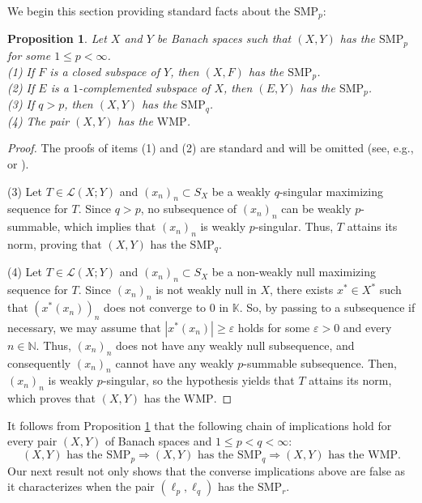 \documentclass[12 pt]{article}%
\newtheorem{proposition}[theorem]{Proposition}
\newtheorem{final remark}[theorem]{Final Remark}
\newcommand {\K} {\mathbb{K}}
\newcommand {\N} {\mathbb{N}}
\begin{document}
We begin this section providing standard facts about the $\mathrm{SMP}_p$:


\begin{proposition}
\label{prop1}
Let $X$ and $Y$ be Banach spaces such that $(X, Y)$ has the $\mathrm{SMP}_p$ for some $1 \leq p < \infty$. \\
{\rm (1)} If $F$ is a closed subspace of $Y$, then $(X,F)$ has the $\mathrm{SMP}_p$. \\
{\rm (2)} If $E$ is a $1$-complemented subspace of $X$, then $(E,Y)$ has the $\mathrm{SMP}_p$. \\
{\rm (3)} If $q > p$, then $(X, Y)$ has the $\mathrm{SMP}_q$. \\
{\rm (4)} The pair $(X, Y)$ has the $\mathrm{WMP}$.
\end{proposition}


\begin{proof}
    The proofs of items (1) and (2) are standard and will be omitted (see, e.g., \cite[Proposition 2.2]{dantasjung} or \cite[Proposition 3.3]{luizmiranda}). 

    (3) Let $T \in \mathcal{L}(X;Y)$ and $(x_{n})_{n} \subset S_X$ be a weakly $q$-singular maximizing sequence for $T$. Since $q > p$, no subsequence of $(x_n)_n$ can be weakly $p$-summable, which implies that $(x_n)_n$ is weakly $p$-singular. Thus, $T$ attains its norm, proving that $(X, Y)$ has the $\mathrm{SMP}_q$.

    (4) Let  $T \in \mathcal{L}(X;Y)$ and $(x_{n})_{n} \subset S_X$ be a non-weakly null maximizing sequence for $T$. Since $(x_n)_n$ is not weakly null in $X$, there exists $x^* \in X^*$ such that $(x^*(x_n))_n$ does not converge to $0$ in $\K$. So, by passing to a subsequence if necessary, we may assume that $|x^*(x_n)| \geq \varepsilon$ holds for some $\varepsilon > 0$ and every $n \in \N$. Thus, $(x_n)_n$ does not have any weakly null subsequence, and consequently $(x_n)_n$ cannot have any weakly $p$-summable subsequence. Then, $(x_n)_n$ is weakly $p$-singular, so the hypothesis yields that $T$ attains its norm, which proves that $(X, Y)$ has the $\mathrm{WMP}$.
\end{proof} 



It follows from Proposition \ref{prop1} that the following chain of implications hold for every pair $(X, Y)$ of Banach spaces and $1 \leq p < q < \infty$:
$$ (X, Y) \text{ has the } \mathrm{SMP}_p \Rightarrow (X, Y) \text{ has the } \mathrm{SMP}_q \Rightarrow (X, Y) \text{ has the } \mathrm{WMP}. $$
Our next result not only shows that the converse implications above are false as it characterizes when the pair $(\ell_p, \ell_q)$ has the $\mathrm{SMP}_r$.
\end{document}
